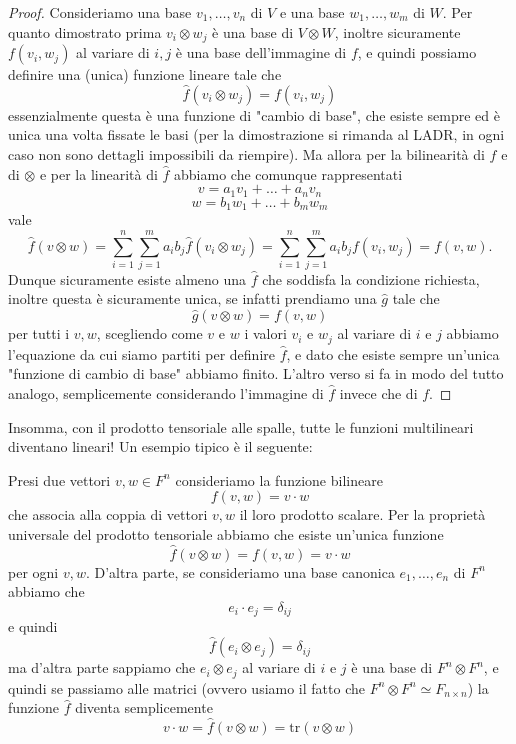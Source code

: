 \documentclass[11pt]{scrartcl}
\newcommand{\tr}[1]{\text{tr}\!\left(#1\right)}
\begin{document}
   	 \begin{proof}
   	 	Consideriamo una base $v_1,\dots, v_n$ di $V$ e una base $w_1,\dots,w_m$ di $W$. Per quanto dimostrato prima $v_i\otimes w_j$ è una base di $V\otimes W$, inoltre sicuramente $f(v_i,w_j)$ al variare di $i,j$ è una base dell'immagine di $f$, e quindi possiamo definire una (unica) funzione lineare tale che
   	 	$$\hat{f}(v_i\otimes w_j)=f(v_i,w_j)$$
   	 	essenzialmente questa è una funzione di "cambio di base", che esiste sempre ed è unica una volta fissate le basi (per la dimostrazione si rimanda al LADR, in ogni caso non sono dettagli impossibili da riempire). Ma allora per la bilinearità di $f$ e di $\otimes$ e per la linearità di $\hat{f}$ abbiamo che comunque rappresentati 
   	 	$$v=a_1v_1+\dots+a_nv_n$$
   	 	$$w=b_1w_1+\dots+b_mw_m$$
   	 	vale
   	 	$$\hat{f}(v\otimes w)=\sum_{i=1}^{n}\sum_{j=1}^{m}a_ib_j\hat{f}(v_i\otimes w_j)=\sum_{i=1}^{n}\sum_{j=1}^{m}a_ib_jf(v_i,w_j)=f(v,w).$$
   	 	Dunque sicuramente esiste almeno una $\hat{f}$ che soddisfa la condizione richiesta, inoltre questa è sicuramente unica, se infatti prendiamo una $\hat{g}$ tale che 
   	 	$$\hat{g}(v\otimes w)=f(v,w)$$
   	 	per tutti i $v,w$, scegliendo come $v$ e $w$ i valori $v_i$ e $w_j$ al variare di $i$ e $j$ abbiamo l'equazione da cui siamo partiti per definire $\hat{f}$, e dato che esiste sempre un'unica "funzione di cambio di base" abbiamo finito. L'altro verso si fa in modo del tutto analogo, semplicemente considerando l'immagine di $\hat{f}$ invece che di $f$.
   	 \end{proof}
   	 Insomma, con il prodotto tensoriale alle spalle, tutte le funzioni multilineari diventano lineari! Un esempio tipico è il seguente:
   	 \begin{example}
   	 	Presi due vettori $v,w\in F^n$ consideriamo la funzione bilineare
   	 	$$f(v,w)=v\cdot w$$
   	 	che associa alla coppia di vettori $v,w$ il loro prodotto scalare. Per la proprietà universale del prodotto tensoriale abbiamo che esiste un'unica funzione
   	 	$$\hat{f}(v\otimes w)=f(v,w)=v\cdot w$$
   	 	per ogni $v,w$. D'altra parte, se consideriamo una base canonica $e_1,\dots,e_n$ di $F^n$ abbiamo che 
   	 	$$e_i\cdot e_j=\delta_{ij}$$
   	 	e quindi 
   	 	$$\hat{f}(e_i\otimes e_j)=\delta_{ij}$$
   	 	ma d'altra parte sappiamo che $e_i\otimes e_j$ al variare di $i$ e $j$ è una base di $F^n\otimes F^n$, e quindi se passiamo alle matrici (ovvero usiamo il fatto che $F^n\otimes F^n \simeq F_{n\times n}$) la funzione $\hat{f}$ diventa semplicemente
   	 	$$v\cdot w=\hat{f}(v\otimes w)=\tr{v\otimes w}$$
   	 \end{example}
\end{document}
